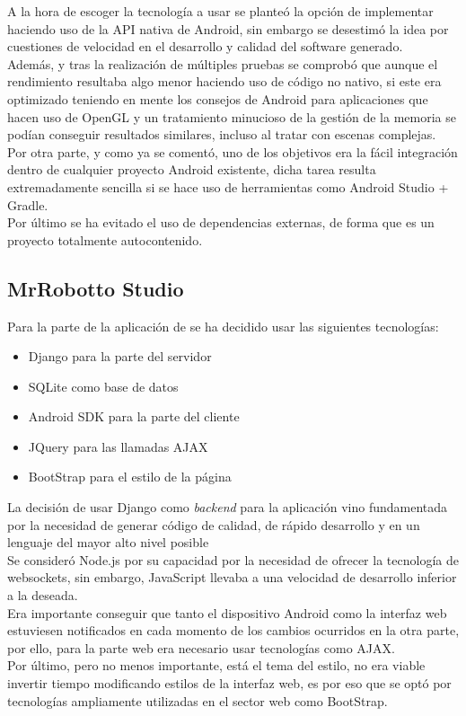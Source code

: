 A la hora de escoger la tecnología a usar se planteó la opción de implementar \robotto haciendo uso de la API nativa de Android, sin embargo se desestimó la idea por cuestiones de velocidad en el desarrollo y calidad del software generado.\\
Además, y tras la realización de múltiples pruebas se comprobó que aunque el rendimiento resultaba algo menor haciendo uso de código no nativo, si este era optimizado teniendo en mente los consejos de Android para aplicaciones que hacen uso de OpenGL y un tratamiento minucioso de la gestión de la memoria se podían conseguir resultados similares, incluso al tratar con escenas complejas.\\
Por otra parte, y como ya se comentó, uno de los objetivos era la fácil integración dentro de cualquier proyecto Android existente, dicha tarea resulta extremadamente sencilla si se hace uso de herramientas como Android Studio + Gradle.\\
Por último se ha evitado el uso de dependencias externas, de forma que \robotto es un proyecto totalmente autocontenido.\\

\subsection{MrRobotto Studio}

Para la parte de la aplicación de \studio se ha decidido usar las siguientes tecnologías:

\begin{itemize}
\item Django para la parte del servidor
\item SQLite como base de datos
\item Android SDK para la parte del cliente
\item JQuery para las llamadas AJAX
\item BootStrap para el estilo de la página
\end{itemize}

La decisión de usar Django como \textit{backend} para la aplicación vino fundamentada por la necesidad de generar código de calidad, de rápido desarrollo y en un lenguaje del mayor alto nivel posible\\

Se consideró Node.js por su capacidad por la necesidad de ofrecer la tecnología de websockets, sin embargo, JavaScript llevaba a una velocidad de desarrollo inferior a la deseada.\\

Era importante conseguir que tanto el dispositivo Android como la interfaz web estuviesen notificados en cada momento de los cambios ocurridos en la otra parte, por ello, para la parte web era necesario usar tecnologías como AJAX.\\

Por último, pero no menos importante, está el tema del estilo, no era viable invertir tiempo modificando estilos de la interfaz web, es por eso que se optó por tecnologías ampliamente utilizadas en el sector web como BootStrap.